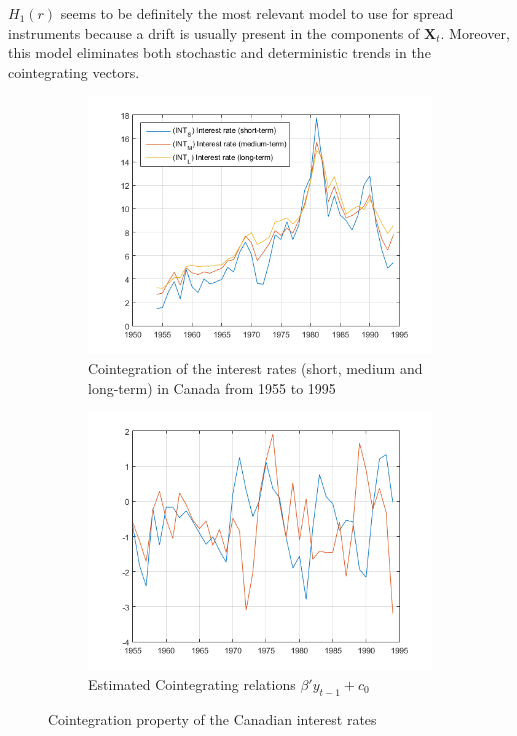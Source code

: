 \documentclass[11pt,a4,twosided,singlespacing,titlepagenumber=on]{scrreprt}
\numberwithin{equation}{chapter} %
\theoremstyle{remark}
\newcommand{\matr}[1]{\mathbf{#1}}
\begin{document}
$H_1(r)$ seems to be definitely the most relevant model to use for spread instruments because a drift is usually present in the components of $\matr{X}_t$. Moreover, this model eliminates both stochastic and deterministic trends in the cointegrating vectors.

\begin{figure}[H]
    \centering
    \begin{subfigure}[t]{0.49\textwidth}
        \centering
        \includegraphics[width=1\textwidth]{TestMultipleSeriesForCointegrationUsingJcitestExample_01}
        \caption{Cointegration of the interest rates (short, medium and long-term) in Canada from 1955 to 1995}
        \label{TestMultipleSeriesForCointegrationUsingJcitestExample_01}
    \end{subfigure}
    \begin{subfigure}[t]{0.49\textwidth}
        \centering
        \includegraphics[width=1\textwidth]{TestMultipleSeriesForCointegrationUsingJcitestExample_02}
        \caption{Estimated Cointegrating relations $\beta' y_{t-1} + c_0$}
        \label{TestMultipleSeriesForCointegrationUsingJcitestExample_02}
    \end{subfigure}
    \caption{Cointegration property of the Canadian interest rates}
\end{figure}
\end{document}
